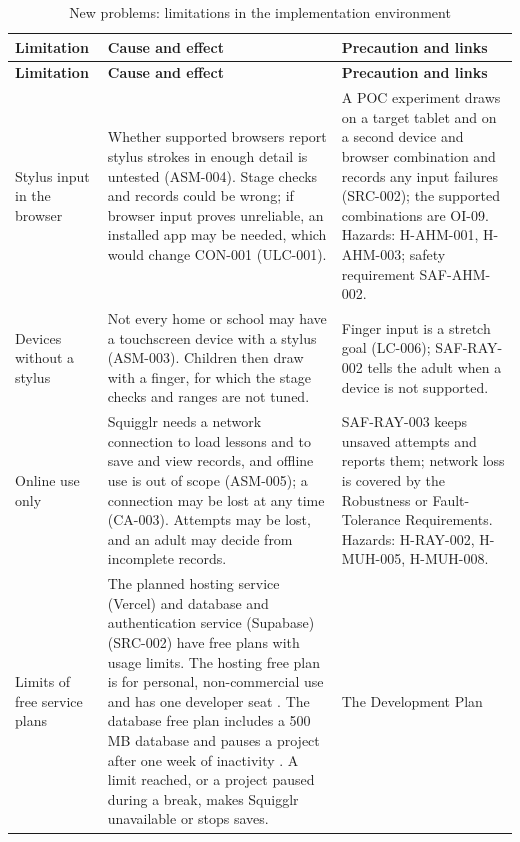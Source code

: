 \documentclass[12pt]{article}
\renewcommand{\_}{\textunderscore\allowbreak}%
\begin{document}
{\small
\begin{longtable}{@{}>{\raggedright\arraybackslash}p{}%
>{\raggedright\arraybackslash}p{}%
>{\raggedright\arraybackslash}p{}@{}}
\caption{New problems: limitations in the implementation environment}
\label{tab:new-problems-limits}\\
\toprule
\textbf{Limitation} & \textbf{Cause and effect} & \textbf{Precaution and links}
\\
\midrule
\endfirsthead
\toprule
\textbf{Limitation} & \textbf{Cause and effect} & \textbf{Precaution and links}
\\
\midrule
\endhead
\bottomrule
\endlastfoot
Stylus input in the browser & Whether supported browsers report stylus strokes
in enough detail is untested (ASM-004). Stage checks and records could be wrong;
if browser input proves unreliable, an installed app may be needed, which would
change CON-001 (ULC-001). & A POC experiment draws on a target tablet and on a
second device and browser combination and records any input failures (SRC-002);
the supported combinations are OI-09. Hazards: H-AHM-001, H-AHM-003; safety
requirement SAF-AHM-002. \\
\addlinespace
Devices without a stylus & Not every home or school may have a touchscreen
device with a stylus (ASM-003). Children then draw with a finger, for which the
stage checks and ranges are not tuned. & Finger input is a stretch goal
(LC-006); SAF-RAY-002 tells the adult when a device is not supported. \\
\addlinespace
Online use only & Squigglr needs a network connection to load lessons and to
save and view records, and offline use is out of scope (ASM-005); a connection
may be lost at any time (CA-003). Attempts may be lost, and an adult may decide
from incomplete records. & SAF-RAY-003 keeps unsaved attempts and reports them;
network loss is covered by the Robustness or Fault-Tolerance Requirements.
Hazards: H-RAY-002, H-MUH-005, H-MUH-008. \\
\addlinespace
Limits of free service plans & The planned hosting service (Vercel) and database
and authentication service (Supabase) (SRC-002) have free plans with usage
limits. The hosting free plan is for personal, non-commercial use and has one
developer seat \citep{Vercel2026Pricing}. The database free plan includes a
500\,MB database and pauses a project after one week of inactivity
\citep{Supabase2026Pricing}. A limit reached, or a project paused during a
break, makes Squigglr unavailable or stops saves. & The Development Plan

\end{longtable}}
\end{document}
